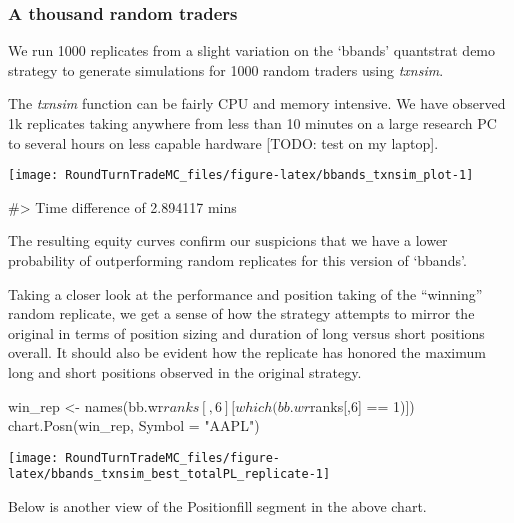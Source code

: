 \hypertarget{a-thousand-random-traders}{%
\subsubsection{A thousand random
traders}\label{a-thousand-random-traders}}

We run 1000 replicates from a slight variation on the `bbands'
quantstrat demo strategy to generate simulations for 1000 random traders
using \emph{txnsim}.

The \emph{txnsim} function can be fairly CPU and memory intensive. We
have observed 1k replicates taking anywhere from less than 10 minutes on
a large research PC to several hours on less capable hardware {[}TODO:
test on my laptop{]}.

\begin{Schunk}


\begin{center}\texttt{[image: RoundTurnTradeMC\_files/figure-latex/bbands\_txnsim\_plot-1]} \end{center}

\begin{Soutput}
#> Time difference of 2.894117 mins
\end{Soutput}
\end{Schunk}

The resulting equity curves confirm our suspicions that we have a lower
probability of outperforming random replicates for this version of
`bbands'.

Taking a closer look at the performance and position taking of the
``winning'' random replicate, we get a sense of how the strategy
attempts to mirror the original in terms of position sizing and duration
of long versus short positions overall. It should also be evident how
the replicate has honored the maximum long and short positions observed
in the original strategy.

\begin{Schunk}
\begin{Sinput}
win_rep <- names(bb.wr$ranks[,6][which(bb.wr$ranks[,6] == 1)])
chart.Posn(win_rep, Symbol = "AAPL") 
\end{Sinput}


\begin{center}\texttt{[image: RoundTurnTradeMC\_files/figure-latex/bbands\_txnsim\_best\_totalPL\_replicate-1]} \end{center}

\end{Schunk}

Below is another view of the Positionfill segment in the above chart.

